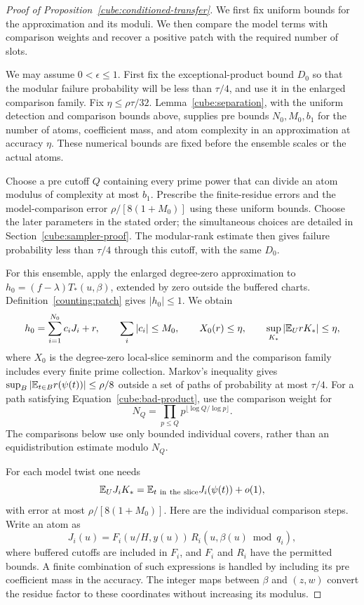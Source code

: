 \begin{proof}[Proof of Proposition~\ref{cube:conditioned-transfer}]
We first fix uniform bounds for the approximation and its moduli.
We then compare the model terms with comparison weights and recover
a positive patch with the required number of slots.

We may assume $0<\epsilon\le1$.  First fix the exceptional-product
bound $D_0$ so that the modular failure probability will be less than
$\tau/4$, and use it in the enlarged comparison family.  Fix
$\eta\le\rho\tau/32$.  Lemma~\ref{cube:separation}, with the
uniform detection and comparison bounds above, supplies pre bounds
$N_0,M_0,b_1$ for the number of atoms, coefficient mass, and atom
complexity in an approximation at accuracy $\eta$.  These numerical
bounds are fixed before the ensemble scales or the actual atoms.

Choose a pre cutoff $Q$ containing every prime power that can divide
an atom modulus of complexity at most $b_1$.  Prescribe the
finite-residue errors and the model-comparison error
$\rho/[8(1+M_0)]$ using these uniform bounds.  Choose the later
parameters in the stated order; the simultaneous choices are detailed
in Section~\ref{cube:sampler-proof}.  The modular-rank estimate then
gives failure probability less than $\tau/4$ through this cutoff,
with the same $D_0$.

For this ensemble, apply the enlarged degree-zero approximation to
$h_0=(f-\lambda)T_*(u,\beta)$, extended by zero outside the buffered
charts.  Definition~\ref{counting:patch} gives $|h_0|\le1$.  We obtain
\[
 h_0=\sum_{i=1}^{N_0}c_iJ_i+r,\qquad
 \sum_i|c_i|\le M_0,
 \qquad X_0(r)\le\eta,
 \qquad \sup_{K_*}|\mathbb E_UrK_*|\le\eta,
\]
where $X_0$ is the degree-zero local-slice seminorm and the comparison
family includes every finite prime collection.  Markov's inequality gives
$\sup_B|\mathbb E_{t\in B}r(\psi(t))|\le\rho/8$ outside a set of paths
of probability at most $\tau/4$.  For a path satisfying
Equation~\eqref{cube:bad-product}, use the comparison weight for
\[
 N_Q=\prod_{p\le Q}p^{\lfloor\log Q/\log p\rfloor}.
\]
The comparisons below use only bounded individual covers, rather than
an equidistribution estimate modulo $N_Q$.

For each model twist one needs
\begin{equation}
 \mathbb E_U J_i K_*
       =\mathbb E_{t\ {\rm in\ the\ slice}}J_i(\psi(t))+o(1),
 \label{cube:model-comparison}
\end{equation}
with error at most $\rho/[8(1+M_0)]$.  Here are the individual
comparison steps.  Write an atom as
\[
 J_i(u)=F_i(u/H,y(u))\,R_i(u,\beta(u)\bmod q_i),
\]
where buffered cutoffs are included in $F_i$, and $F_i$ and $R_i$
have the permitted bounds.  A finite combination of such expressions
is handled by including its pre coefficient mass in the accuracy.
The integer maps between $\beta$ and $(z,w)$ convert the residue
factor to these coordinates without increasing its modulus.


\end{proof}
